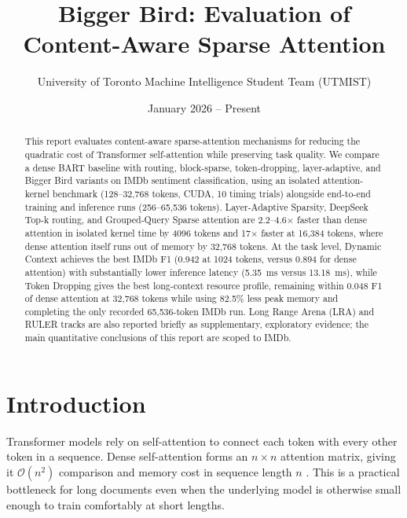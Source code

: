 \documentclass[11pt]{article}
\title{Bigger Bird: Evaluation of Content-Aware Sparse Attention}
\author{University of Toronto Machine Intelligence Student Team (UTMIST)}
\date{January 2026 -- Present}
\newcommand{\bigO}{\mathcal{O}}
\begin{document}
\maketitle

\begin{abstract}
This report evaluates content-aware sparse-attention mechanisms for reducing the
quadratic cost of Transformer self-attention while preserving task quality. We
compare a dense BART baseline with routing, block-sparse, token-dropping,
layer-adaptive, and Bigger Bird variants on IMDb sentiment classification, using
an isolated attention-kernel benchmark (128--32{,}768 tokens, CUDA, 10 timing
trials) alongside end-to-end training and inference runs (256--65{,}536 tokens).
Layer-Adaptive Sparsity, DeepSeek Top-k routing, and Grouped-Query Sparse
attention are 2.2--4.6$\times$ faster than dense attention in isolated kernel
time by 4096 tokens and 17$\times$ faster at 16{,}384 tokens, where dense
attention itself runs out of memory by 32{,}768 tokens. At the task level,
Dynamic Context achieves the best IMDb F1 (0.942 at 1024 tokens, versus 0.894
for dense attention) with substantially lower inference latency (5.35~ms versus
13.18~ms), while Token Dropping gives the best long-context resource profile,
remaining within 0.048 F1 of dense attention at 32{,}768 tokens while using
82.5\% less peak memory and completing the only recorded 65{,}536-token IMDb
run. Long Range Arena (LRA) and RULER tracks are also reported briefly as
supplementary, exploratory evidence; the main quantitative conclusions of this
report are scoped to IMDb.
\end{abstract}

\newpage
\tableofcontents

\newpage
\section{Introduction}

Transformer models rely on self-attention to connect each token with every
other token in a sequence. Dense self-attention forms an $n\times n$ attention
matrix, giving it $\bigO(n^2)$ comparison and memory cost in sequence length
$n$ \citep{vaswani2017attention}. This is a practical bottleneck for long documents even when the
underlying model is otherwise small enough to train comfortably at short
lengths.
\end{document}

